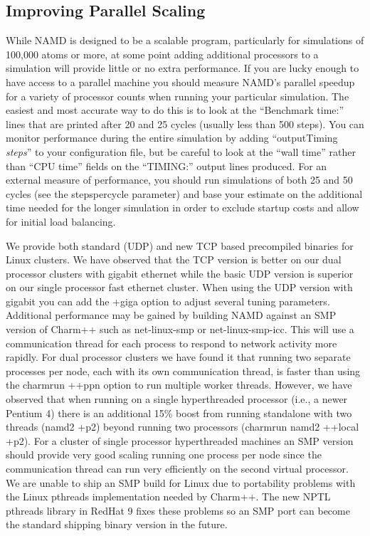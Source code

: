 \subsection{Improving Parallel Scaling}

While NAMD is designed to be a scalable program, particularly for
simulations of 100,000 atoms or more, at some point adding additional
processors to a simulation will provide little or no extra performance.
If you are lucky enough to have access to a parallel machine you should
measure NAMD's parallel speedup for a variety of processor counts when
running your particular simulation.  The easiest and most accurate way
to do this is to look at the ``Benchmark time:'' lines that are printed
after 20 and 25 cycles (usually less than 500 steps).  You can monitor
performance during the entire simulation by adding ``outputTiming {\em steps}''
to your configuration file, but be careful to look at the ``wall time''
rather than ``CPU time'' fields on the ``TIMING:'' output lines produced.
For an external measure of performance, you should run simulations of
both 25 and 50 cycles (see the stepspercycle parameter) and base your
estimate on the additional time needed for the longer simulation in
order to exclude startup costs and allow for initial load balancing.

We provide both standard (UDP) and new TCP based precompiled binaries
for Linux clusters.  We have observed that the TCP version is better
on our dual processor clusters with gigabit ethernet while the basic
UDP version is superior on our single processor fast ethernet cluster.
When using the UDP version with gigabit you can add the +giga option
to adjust several tuning parameters.  Additional performance may be
gained by building NAMD against an SMP version of Charm++ such as
net-linux-smp or net-linux-smp-icc.  This will use a communication
thread for each process to respond to network activity more rapidly.
For dual processor clusters we have found it that running two separate
processes per node, each with its own communication thread, is faster
than using the charmrun ++ppn option to run multiple worker threads.
However, we have observed that when running on a single hyperthreaded
processor (i.e., a newer Pentium 4) there is an additional 15\% boost
from running standalone with two threads (namd2 +p2) beyond running
two processors (charmrun namd2 ++local +p2).  For a cluster of single
processor hyperthreaded machines an SMP version should provide very
good scaling running one process per node since the communication
thread can run very efficiently on the second virtual processor.  We
are unable to ship an SMP build for Linux due to portability problems
with the Linux pthreads implementation needed by Charm++.  The new
NPTL pthreads library in RedHat 9 fixes these problems so an SMP port
can become the standard shipping binary version in the future.

